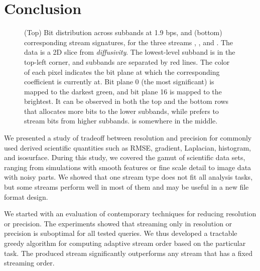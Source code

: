 \section{Conclusion}

\begin{figure}[t]
\centering
 
\caption{(Top) Bit distribution across subbands at 1.9 bps, and (bottom) corresponding stream
signatures, for the three streams \ssig, \slsg, and \shsg. The data is a 2D slice from
\emph{diffusivity}. The lowest-level subband is in the top-left corner, and subbands are separated
by red lines. The color of each pixel indicates the bit plane at which the corresponding coefficient
is currently at. Bit plane 0 (the most significant) is mapped to the darkest green, and bit plane 16
is mapped to the brightest. It can be observed in both the top and the bottom rows that \shsg
allocates more bits to the lower subbands, while \slsg prefers to stream bits from higher subbands.
\ssig is somewhere in the middle.}
\label{fig:bit-distrib}
\end{figure}

We presented a study of tradeoff between resolution and precision for commonly used derived
scientific quantities such as RMSE, gradient, Laplacian, histogram, and isosurface.
During this study, we covered the gamut of scientific data sets, ranging from simulations
with smooth features or fine scale detail to image data with noisy parts.
We showed that one stream type does not fit all analysis tasks, but some streams perform well
in most of them and may be useful in a new file format design.

We started with an evaluation of contemporary techniques for reducing resolution or precision.
The experiments showed that streaming only in resolution or precision is suboptimal for all
tested queries. We thus developed a tractable greedy algorithm for computing adaptive stream order
based on the particular task. The produced stream significantly outperforms any stream that has
a fixed streaming order.

